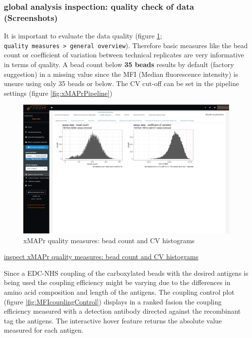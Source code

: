 \documentclass[
]{book}
\begin{document}
\hypertarget{global-analysis-inspection-quality-check-of-data-screenshots}{%
\subsubsection{global analysis inspection: quality check of data (Screenshots)}\label{global-analysis-inspection-quality-check-of-data-screenshots}}

It is important to evaluate the data quality (figure \ref{fig:beadCountCVhist}; \texttt{quality\ measures\ \textgreater{}\ general\ overview}). Therefore basic measures like the bead count or coefficient of variation between technical replicates are very informative in terms of quality.
A bead count below \textbf{35 beads} results by default (factory suggestion) in a missing value since the MFI (Median fluorescence intensity) is unsure using only 35 beads or below.
The CV cut-off can be set in the pipeline settings (figure \ref{fig:xMAPrPipeline})

\begin{figure}
\includegraphics[width=50.47in]{figures/quality_measures__general_overview} \caption{xMAPr quality measures: bead count and CV histograms}\label{fig:beadCountCVhist}
\end{figure}

\href{figures/quality_measures__general_overview.png}{inspect xMAPr quality measures: bead count and CV histograms}

Since a EDC-NHS coupling of the carboxylated beads with the desired antigens is being used the coupling efficiency might be varying due to the differences in amino acid composition and length of the antigens.
The coupling control plot (figure \ref{fig:MFIcouplingControl}) displays in a ranked fasion the coupling efficiency measured with a detection antibody directed against the recombinant tag the antigens. The interactive hover feature returns the absolute value measured for each antigen.
\end{document}

